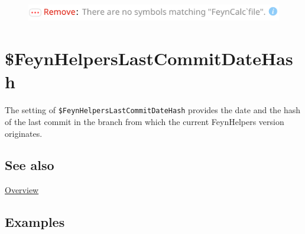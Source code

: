 \documentclass[../FeynHelpersManual.tex]{subfiles}
\begin{document}
\FloatBarrier
\begin{figure}[!ht]
\centering
\includegraphics[width=0.6\linewidth]{img/0fr2yhbgg9nsx.pdf}
\end{figure}
\FloatBarrier

\hypertarget{dollarfeynhelperslastcommitdatehash}{
\section{\$FeynHelpersLastCommitDateHash}\label{dollarfeynhelperslastcommitdatehash}}

The setting of \texttt{\$FeynHelpersLastCommitDateHash} provides the
date and the hash of the last commit in the branch from which the
current FeynHelpers version originates.

\subsection{See also}

\hyperlink{toc}{Overview}

\subsection{Examples}
\end{document}
